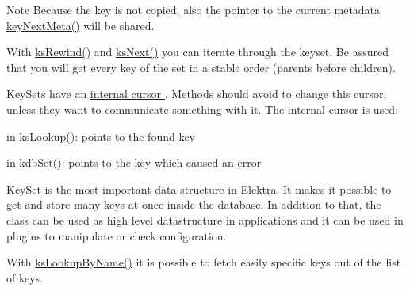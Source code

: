 \begin{DoxyNote}{Note}
Because the key is not copied, also the pointer to the current metadata \hyperlink{group__keymeta_ga4c88342f580a4291455a801af71ce048}{key\-Next\-Meta()} will be shared. 
\end{DoxyNote}


With \hyperlink{group__keyset_gabe793ff51f1728e3429c84a8a9086b70}{ks\-Rewind()} and \hyperlink{group__keyset_ga317321c9065b5a4b3e33fe1c399bcec9}{ks\-Next()} you can iterate through the keyset. Be assured that you will get every key of the set in a stable order (parents before children).

Key\-Sets have an \hyperlink{group__keyset_ga4287b9416912c5f2ab9c195cb74fb094}{internal cursor }. Methods should avoid to change this cursor, unless they want to communicate something with it. The internal cursor is used\-:


\begin{DoxyItemize}
\item in \hyperlink{group__keyset_gaa34fc43a081e6b01e4120daa6c112004}{ks\-Lookup()}\-: points to the found key
\item in \hyperlink{group__kdb_ga11436b058408f83d303ca5e996832bcf}{kdb\-Set()}\-: points to the key which caused an error
\end{DoxyItemize}

Key\-Set is the most important data structure in Elektra. It makes it possible to get and store many keys at once inside the database. In addition to that, the class can be used as high level datastructure in applications and it can be used in plugins to manipulate or check configuration.

With \hyperlink{group__keyset_gad2e30fb6d4739d917c5abb2ac2f9c1a1}{ks\-Lookup\-By\-Name()} it is possible to fetch easily specific keys out of the list of keys.

